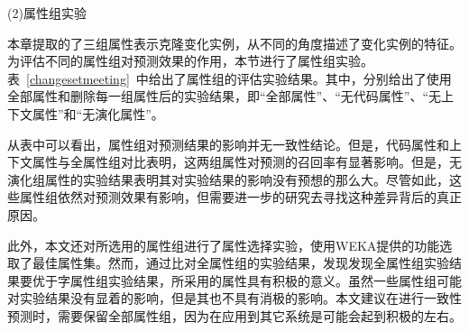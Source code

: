
(2)属性组实验

本章提取的了三组属性表示克隆变化实例，从不同的角度描述了变化实例的特征。为评估不同的属性组对预测效果的作用，本节进行了属性组实验。表~\ref{changesetmeeting}~中给出了属性组的评估实验结果。其中，分别给出了使用全部属性和删除每一组属性后的实验结果，即“全部属性”、“无代码属性”、“无上下文属性”和“无演化属性”。

从表中可以看出，属性组对预测结果的影响并无一致性结论。但是，代码属性和上下文属性与全属性组对比表明，这两组属性对预测的召回率有显著影响。但是，无演化组属性的实验结果表明其对实验结果的影响没有预想的那么大。尽管如此，这些属性组依然对预测效果有影响，但需要进一步的研究去寻找这种差异背后的真正原因。

此外，本文还对所选用的属性组进行了属性选择实验，使用WEKA提供的功能选取了最佳属性集。然而，通过比对全属性组的实验结果，发现发现全属性组实验结果要优于字属性组实验结果，所采用的属性具有积极的意义。虽然一些属性组可能对实验结果没有显着的影响，但是其也不具有消极的影响。本文建议在进行一致性预测时，需要保留全部属性组，因为在应用到其它系统是可能会起到积极的左右。

